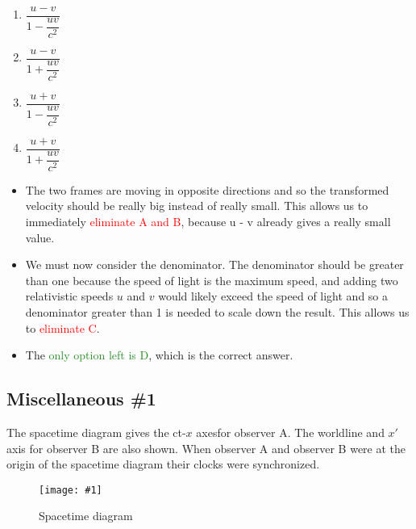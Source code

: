 \documentclass[a4paper,12pt]{article}
\newcommand{\img}[4]{\begin{center}
  \begin{figure}[H]
    \centering
    \texttt{[image: \#1]}
    \caption{#3}
    \label{fig:#4}
  \end{figure}
\end{center}}
\begin{document}
\begin{enumerate}[label=(\Alph*)]
  \item $\dfrac{u - v}{1 - \dfrac{uv}{c^2}}$
  \item $\dfrac{u - v}{1 + \dfrac{uv}{c^2}}$
  \item $\dfrac{u + v}{1 - \dfrac{uv}{c^2}}$
  \item $\dfrac{u + v}{1 + \dfrac{uv}{c^2}}$
\end{enumerate}

\begin{itemize}
  \item The two frames are moving in opposite directions and so the transformed velocity should be really big instead of really small. This allows us to immediately \textcolor{red}{eliminate A and B}, because u - v already gives a really small value.
  \item We must now consider the denominator. The denominator should be greater than one because the speed of light is the maximum speed, and adding two relativistic speeds $u$ and $v$ would likely exceed the speed of light and so a denominator greater than 1 is needed to scale down the result. This allows us to \textcolor{red}{eliminate C}.
  \item The \textcolor{ForestGreen}{only option left is D}, which is the correct answer.
\end{itemize}

\pagebreak

\subsection{Miscellaneous \#1}
The spacetime diagram gives the ct-$x$ axesfor observer A. The worldline and $x'$ axis for observer B are also shown. When observer A and observer B were at the
origin of the spacetime diagram their clocks were synchronized.

\img{ex/1.png}{0.95}{Spacetime diagram}{misc1}
\end{document}
